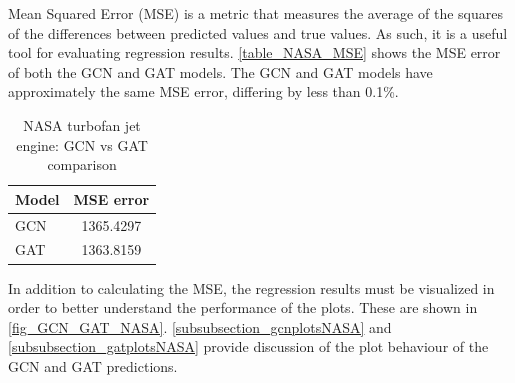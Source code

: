 \documentclass[12pt]{article}
\begin{document}
Mean Squared Error (MSE) is a metric that measures the average of the squares of the differences between predicted values and true values. As such, it is a useful tool for evaluating regression results. \autoref{table_NASA_MSE} shows the MSE error of both the GCN and GAT models. The GCN and GAT models have approximately the same MSE error, differing by less than 0.1\%.

\begin{table}[H]
\centering
\caption{NASA turbofan jet engine: GCN vs GAT comparison}
\begin{tabular}{|l|c|}
\hline
\textbf{Model} & \textbf{MSE error}\\
\hline
GCN & 1365.4297  \\
GAT & 1363.8159  \\
\hline
\end{tabular}
\label{table_NASA_MSE}
\end{table}

In addition to calculating the MSE, the regression results must be visualized in order to better understand the performance of the plots. These are shown in \autoref{fig_GCN_GAT_NASA}. \autoref{subsubsection_gcnplotsNASA} and \autoref{subsubsection_gatplotsNASA} provide discussion of the plot behaviour of the GCN and GAT predictions.
\end{document}
